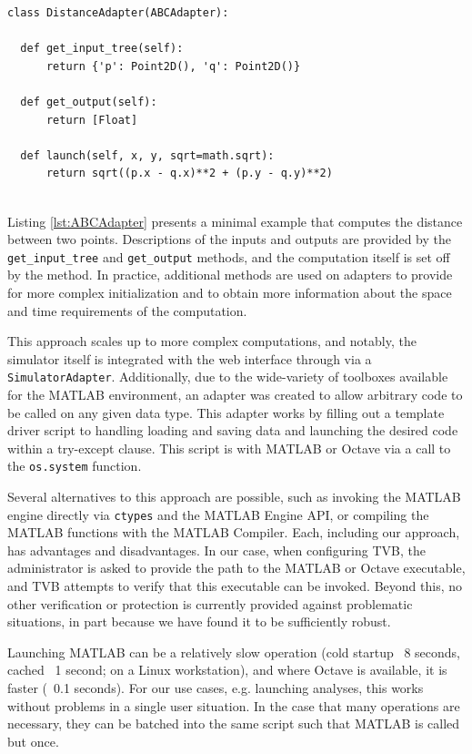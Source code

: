\documentclass{bioinfo}
\begin{document}
\begin{lstlisting}[caption={Example of a minimal adapter},
                   label={lst:ABCAdapter}]
class DistanceAdapter(ABCAdapter):

  def get_input_tree(self):
      return {'p': Point2D(), 'q': Point2D()}

  def get_output(self):
      return [Float]

  def launch(self, x, y, sqrt=math.sqrt):
      return sqrt((p.x - q.x)**2 + (p.y - q.y)**2)
  	
\end{lstlisting}

Listing \ref{lst:ABCAdapter} presents a minimal example that computes the
distance between two points. Descriptions of the inputs and outputs are
provided by the \texttt{get\_input\_tree} and \texttt{get\_output} methods, and
the computation itself is set off by the \texttt{} method. 
In practice, additional methods are used on adapters to provide for more 
complex initialization and to obtain more information about the space and 
time requirements of the computation. 

This approach scales up to more complex computations, and notably, the
simulator itself is integrated with the web interface through via a
\texttt{SimulatorAdapter}. Additionally, due to the wide-variety of toolboxes available 
for the MATLAB environment, an adapter was created to allow arbitrary code
to be called on any given data type. This adapter works by filling out
a template driver script to handling loading and saving data and launching
the desired code within a try-except clause. This script is with MATLAB or
Octave via a call to the \texttt{os.system} function.

Several alternatives to this approach are possible, such as invoking the MATLAB
engine directly via \texttt{ctypes} and the MATLAB Engine API, or compiling the MATLAB
functions with the MATLAB Compiler. Each, including our approach, has advantages 
and disadvantages. In our case, when configuring TVB, the administrator is asked
to provide the path to the MATLAB or Octave executable, and TVB attempts to 
verify that this executable can be invoked. Beyond this, no other verification 
or protection is currently provided against problematic situations, in part
because we have found it to be sufficiently robust. 

Launching MATLAB can be a relatively slow operation (cold startup ~8 seconds,
cached ~1 second; on a Linux workstation), and where Octave is available, it is
faster (~0.1 seconds). For our use cases, e.g. launching analyses, this works
without problems in a single user situation. In the case that many operations
are necessary, they can be batched into the same script such that MATLAB is
called but once.
\end{document}
